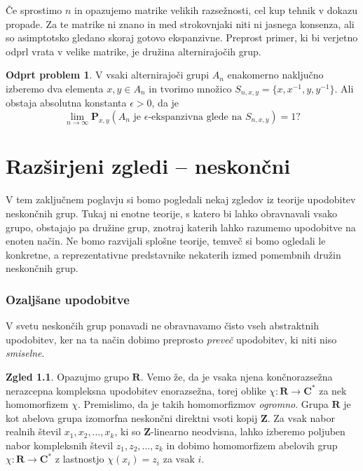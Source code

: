 \documentclass[11pt]{book}
\def\ZZ{\mathbf{Z}}
\def\RR{\mathbf{R}}
\def\CC{\mathbf{C}}
\def\PP{\mathbf{P}}
\theoremstyle{definition}
\theoremstyle{zgled}
\newtheorem*{zgled}{Zgled}
\theoremstyle{odprtproblem}
\newtheorem*{odprtproblem}{Odprt problem}
\theoremstyle{domacanaloga}
\theoremstyle{izrek}
\begin{document}
Če sprostimo $n$ in opazujemo matrike velikih razsežnosti, cel kup tehnik v dokazu propade. Za te matrike ni znano in med strokovnjaki niti ni jasnega konsenza, ali so asimptotsko gledano skoraj gotovo ekspanzivne. Preprost primer, ki bi verjetno odprl vrata v velike matrike, je družina alternirajočih grup.

\begin{odprtproblem}
V vsaki alternirajoči grupi $A_n$ enakomerno naključno izberemo dva elementa $x,y \in A_n$ in tvorimo množico $S_{n,x,y} = \{ x, x^{-1}, y, y^{-1} \}$. Ali obstaja absolutna konstanta $\epsilon > 0$, da je
\[
    \lim_{n \to \infty} \PP_{x,y}(\text{$A_n$ je $\epsilon$-ekspanzivna glede na $S_{n,x,y}$}) = 1 ?
\]
\end{odprtproblem}

\chapter{Razširjeni zgledi -- neskončni}

V tem zaključnem poglavju si bomo pogledali nekaj zgledov iz teorije upodobitev neskončnih grup. Tukaj ni enotne teorije, s katero bi lahko obravnavali vsako grupo, obstajajo pa družine grup, znotraj katerih lahko razumemo upodobitve na enoten način. Ne bomo razvijali splošne teorije, temveč si bomo ogledali le konkretne, a reprezentativne predstavnike nekaterih izmed pomembnih družin neskončnih grup.

\subsection{Ozaljšane upodobitve}

V svetu neskončih grup ponavadi ne obravnavamo čisto vseh abstraktnih upodobitev, ker na ta način dobimo preprosto \emph{preveč} upodobitev, ki niti niso \emph{smiselne}.

\begin{zgled}
Opazujmo grupo $\RR$. Vemo že, da je vsaka njena končnorazsežna nerazcepna kompleksna upodobitev enorazsežna, torej oblike $\chi \colon \RR \to \CC^*$ za nek homomorfizem $\chi$. Premislimo, da je takih homomorfizmov \emph{ogromno}. Grupa $\RR$ je kot abelova grupa izomorfna neskončni direktni vsoti kopij $\ZZ$. Za vsak nabor realnih števil $x_1, x_2, \dots, x_k$, ki so $\ZZ$-linearno neodvisna, lahko izberemo poljuben nabor kompleksnih števil $z_1, z_2, \dots, z_k$ in dobimo homomorfizem abelovih grup $\chi \colon \RR \to \CC^*$ z lastnostjo $\chi(x_i) = z_i$ za vsak $i$.
\end{zgled}
\end{document}
